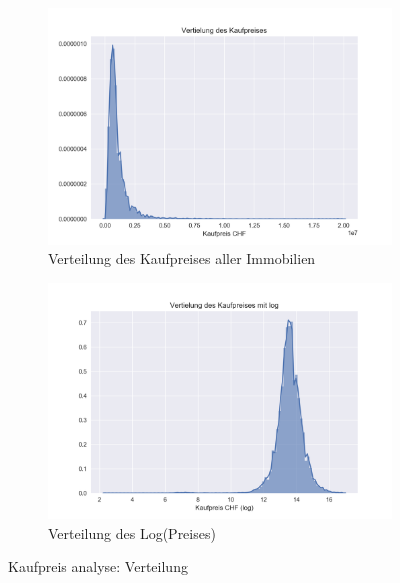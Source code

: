 \begin{figure}[ht]
\begin{subfigure}{.5\textwidth}
  \centering
  \includegraphics[width=\linewidth]{images/Verteilung_des_kauf_preises.png}
  \caption[Verteilung des Kaufpreises aller Immobilien]{Verteilung des Kaufpreises aller Immobilien}
  \label{fig:price_normal}
\end{subfigure}%
\begin{subfigure}{.5\textwidth}
  \centering
  \includegraphics[width=\linewidth]{images/Verteilung_des_kauf_preises_log.png}
  \caption[Verteilung des Log(Preises)]{Verteilung des Log(Preises)}
  \label{fig:price_log}
\end{subfigure}
\caption[Kaufpreis analyse: Verteilung]{Kaufpreis analyse: Verteilung}
\label{fig:price}
\end{figure}
%
\begin{table}[ht]
\centering
{}
\caption{Statistische Werte des Kaufpreises}
\label{tab:price}
\end{table}
%
